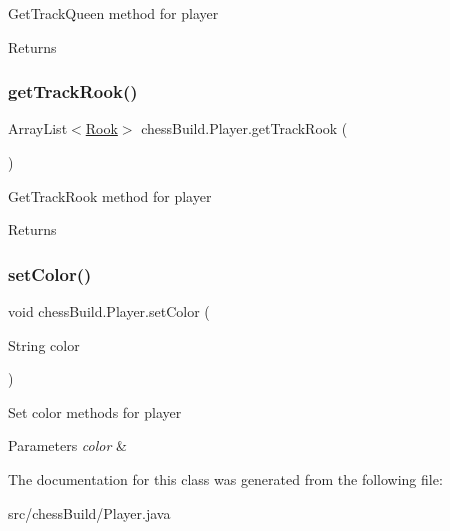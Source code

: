 Get\+Track\+Queen method for player \begin{DoxyReturn}{Returns}

\end{DoxyReturn}
\mbox{\label{classchess_build_1_1_player_a24e07f2fb2000ac07bc7e350b7ba5715}} 
\subsubsection{\texorpdfstring{get\+Track\+Rook()}{getTrackRook()}}
{\footnotesize\ttfamily Array\+List$<$\hyperlink{classchess_build_1_1_rook}{Rook}$>$ chess\+Build.\+Player.\+get\+Track\+Rook (\begin{DoxyParamCaption}{ }\end{DoxyParamCaption})}

Get\+Track\+Rook method for player \begin{DoxyReturn}{Returns}

\end{DoxyReturn}
\mbox{\label{classchess_build_1_1_player_abc3aee1d3b1ce4ab0a12d2c544cc7e08}} 
\subsubsection{\texorpdfstring{set\+Color()}{setColor()}}
{\footnotesize\ttfamily void chess\+Build.\+Player.\+set\+Color (\begin{DoxyParamCaption}\item[{String}]{color }\end{DoxyParamCaption})}

Set color methods for player 
\begin{DoxyParams}{Parameters}
{\em color} & \\
\hline
\end{DoxyParams}


The documentation for this class was generated from the following file\+:\begin{DoxyCompactItemize}
\item 
src/chess\+Build/Player.\+java\end{DoxyCompactItemize}

